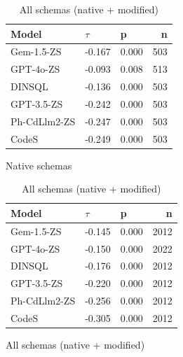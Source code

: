 \begin{table}
  \centering
  \caption{Kendall-Tau ($\tau$) Correlations between \emph{Least Identifier Proportion} and \emph{Query f1}.}
  \begin{subfigure}{.5\linewidth}
      \centering
      \caption{Native schemas}
      \begin{tabular}{lllr}
\toprule
Model & $\tau$ & p & n \\
\midrule
Gem-1.5-ZS & -0.167 & 0.000 & 503 \\
GPT-4o-ZS & -0.093 & 0.008 & 513 \\
DINSQL & -0.136 & 0.000 & 503 \\
GPT-3.5-ZS & -0.242 & 0.000 & 503 \\
Ph-CdLlm2-ZS & -0.247 & 0.000 & 503 \\
CodeS & -0.249 & 0.000 & 503 \\
\bottomrule
\end{tabular}

      \label{table:natlow-f1-ktau-native}
  \end{subfigure}%
  \begin{subfigure}{.5\linewidth}
      \centering
      \caption{All schemas (native + modified)}
      \begin{tabular}{lllr}
\toprule
Model & $\tau$ & p & n \\
\midrule
Gem-1.5-ZS & -0.145 & 0.000 & 2012 \\
GPT-4o-ZS & -0.150 & 0.000 & 2022 \\
DINSQL & -0.176 & 0.000 & 2012 \\
GPT-3.5-ZS & -0.220 & 0.000 & 2012 \\
Ph-CdLlm2-ZS & -0.256 & 0.000 & 2012 \\
CodeS & -0.305 & 0.000 & 2012 \\
\bottomrule
\end{tabular}

      \label{table:natlow-f1-ktau-all}
  \end{subfigure}
\end{table}


